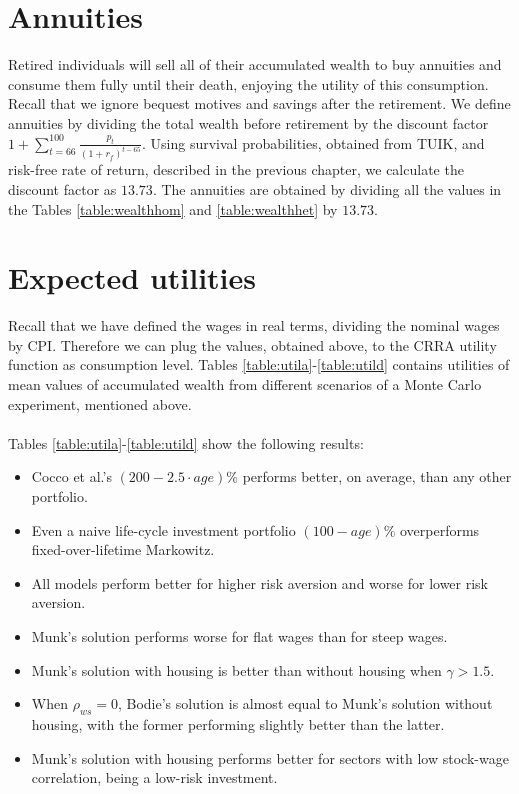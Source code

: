 \section{Annuities}

Retired individuals will sell all of their accumulated wealth to buy annuities and consume them fully until their death, enjoying the utility of this consumption. Recall that we ignore bequest motives and savings after the retirement. We define annuities by dividing the total wealth before retirement by the discount factor $1 + \sum^{100}_{t=66}\frac{p_t}{(1+r_f)^{t-65}}$. Using survival probabilities, obtained from TUIK, and risk-free rate of return, described in the previous chapter, we calculate the discount factor as $13.73$. The annuities are obtained by dividing all the values in the Tables \ref{table:wealthhom} and \ref{table:wealthhet} by $13.73$. 

\section{Expected utilities}
Recall that we have defined the wages in real terms, dividing the nominal wages by CPI. Therefore we can plug the values, obtained above, to the CRRA utility function as consumption level. Tables \ref{table:utila}-\ref{table:utild} contains utilities of mean values of accumulated wealth from different scenarios of a Monte Carlo experiment, mentioned above.

\paragraph*{}Tables \ref{table:utila}-\ref{table:utild} show the following results:
\begin{itemize}

\item Cocco et al.'s $(200-2.5\cdot age)\%$ performs better, on average, than any other portfolio.
\item Even a naive life-cycle investment portfolio $(100-age)\%$ overperforms fixed-over-lifetime Markowitz.
\item All models perform better for higher risk aversion and worse for lower risk aversion.
\item Munk's solution performs worse for flat wages than for steep wages.
\item Munk's solution with housing is better than without housing when $\gamma > 1.5$.
\item When $\rho_{ws}=0$, Bodie's solution is almost equal to Munk's solution without housing, with the former performing slightly better than the latter.
\item Munk's solution with housing performs better for sectors with low stock-wage correlation, being a low-risk investment.
\end{itemize}

